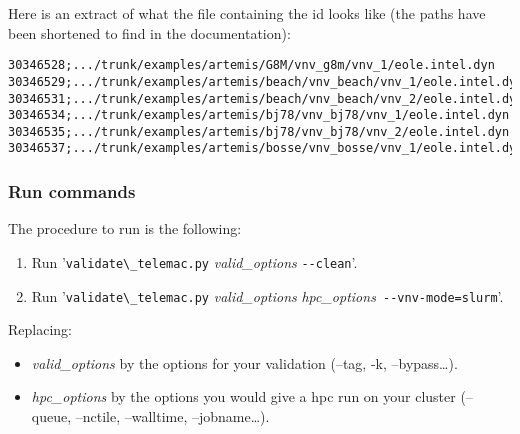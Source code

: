 Here is an extract of what the file containing the id looks like (the paths
have been shortened to find in the documentation):
\begin{verbatim}
30346528;.../trunk/examples/artemis/G8M/vnv_g8m/vnv_1/eole.intel.dyn
30346529;.../trunk/examples/artemis/beach/vnv_beach/vnv_1/eole.intel.dyn
30346531;.../trunk/examples/artemis/beach/vnv_beach/vnv_2/eole.intel.dyn
30346534;.../trunk/examples/artemis/bj78/vnv_bj78/vnv_1/eole.intel.dyn
30346535;.../trunk/examples/artemis/bj78/vnv_bj78/vnv_2/eole.intel.dyn
30346537;.../trunk/examples/artemis/bosse/vnv_bosse/vnv_1/eole.intel.dyn
\end{verbatim}

\subsubsection{Run commands}

The procedure to run is the following:
\begin{enumerate}
  \item Run '\verb!validate\_telemac.py! \textit{valid\_options} \verb!--clean!'.
  \item Run '\verb!validate\_telemac.py! \textit{valid\_options} \textit{hpc\_options}\verb! --vnv-mode=slurm!'.
\end{enumerate}

Replacing:
\begin{itemize}
  \item \textit{valid\_options} by the options for your validation (--tag, -k,
    --bypass\ldots).
  \item \textit{hpc\_options} by the options you would give a hpc \telma{} run on
    your cluster (--queue, --nctile, --walltime, --jobname\ldots).
\end{itemize}
